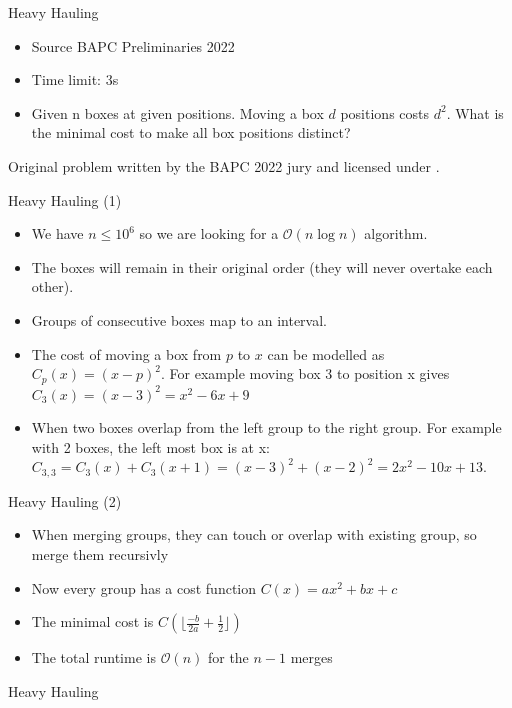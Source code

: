 \documentclass[11pt,pdf, aspectratio=169]{beamer}
\begin{document}
  \begin{frame}{Heavy Hauling}
    \begin{itemize}
      \item Source BAPC Preliminaries 2022
      \item Time limit: 3s
      \item Given n boxes at given positions.
      Moving a box $d$ positions costs $d^2$.
      What is the minimal cost to make all box positions distinct?
    \end{itemize}
    Original problem written by the BAPC 2022 jury and licensed under \doclicenseLongNameRef.

    \doclicenseImage
  \end{frame}
  \begin{frame}{Heavy Hauling (1)}
    \begin{itemize}
      \item We have $n \leq 10^6$ so we are looking for a $\mathcal{O}(n \log n)$ algorithm.
      \item The boxes will remain in their original order (they will never overtake each other).
      \item Groups of consecutive boxes map to an interval.
      \item The cost of moving a box from $p$ to $x$ can be modelled as $C_p(x)  = (x-p)^2$.
      For example moving box 3 to position x gives $C_3(x)=(x-3)^2 = x^2 - 6x +9$
      \item When two boxes overlap from the left group to the right group.
      For example with 2 boxes, the left most box is at x: $C_{3,3}=C_3(x)+C_3(x+1)= (x-3)^2+(x-2)^2=2x^2-10x+13$.
    \end{itemize}
  \end{frame}
  \begin{frame}{Heavy Hauling (2)}
    \begin{itemize}
      \item When merging groups, they can touch or overlap with existing group, so merge them recursivly
      \item Now every group has a cost function $C(x)=ax^2+bx+c$
      \item The minimal cost is $C\left( \lfloor \frac{-b}{2a}+\frac{1}{2}\rfloor \right)$
      \item The total runtime is $\mathcal{O}(n)$ for the $n-1$ merges
    \end{itemize}
  \end{frame}
  \begin{frame}[containsverbatim]{Heavy Hauling}
    \inputminted[fontsize=\tiny]{python}{code/session-4/dapc-h.py}
  \end{frame}
\end{document}
